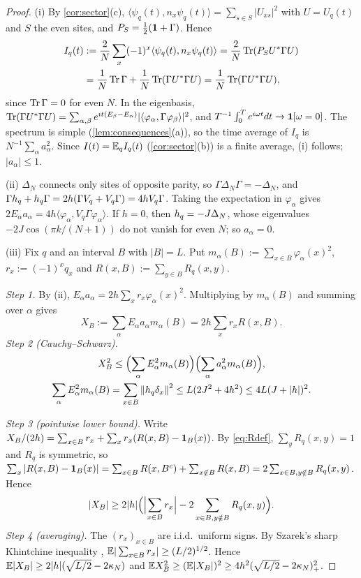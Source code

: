 \begin{proof}
(i) By \cref{cor:sector}(c), $\langle\psi_q(t),n_x\psi_q(t)\rangle=\sum_{s\in S}|U_{xs}|^2$ with $U=U_q(t)$ and
$S$ the even sites, and $P_S=\frac12(\mathbf{1}+\Gamma)$.  Hence
\begin{align*}
  I_q(t)&:=\frac2N\sum_x(-1)^x\langle\psi_q(t),n_x\psi_q(t)\rangle=\frac2N\operatorname{Tr}(P_SU^*\Gamma U)\\
  &=\frac1N\operatorname{Tr}\Gamma+\frac1N\operatorname{Tr}(\Gamma U^*\Gamma U)=\frac1N\operatorname{Tr}(\Gamma U^*\Gamma U),
\end{align*}
since $\operatorname{Tr}\Gamma=0$ for even $N$.  In the eigenbasis,
$\operatorname{Tr}(\Gamma U^*\Gamma U)=\sum_{\alpha,\beta}e^{it(E_\beta-E_\alpha)}|\langle\varphi_\alpha,\Gamma\varphi_\beta\rangle|^2$, and
$T^{-1}\int_0^Te^{i\omega t}dt\to\mathbf{1}[\omega=0]$.  The spectrum is simple (\cref{lem:consequences}(a)), so the
time average of $I_q$ is $N^{-1}\sum_\alpha a_\alpha^2$.  Since $I(t)=\mathbb{E}_qI_q(t)$ (\cref{cor:sector}(b)) is a finite
average, (i) follows; $|a_\alpha|\le1$.

(ii) $\Delta_N$ connects only sites of opposite parity, so $\Gamma\Delta_N\Gamma=-\Delta_N$, and
$\Gamma h_{q}+h_{q}\Gamma=2h(\Gamma V_q+V_q\Gamma)=4hV_q\Gamma$.  Taking the expectation in $\varphi_\alpha$ gives
$2E_\alpha a_\alpha=4h\langle\varphi_\alpha,V_q\Gamma\varphi_\alpha\rangle$.  If $h=0$, then $h_{q}=-J\Delta_N$, whose
eigenvalues $-2J\cos(\pi k/(N+1))$ do not vanish for even $N$; so $a_\alpha=0$.

(iii) Fix $q$ and an interval $B$ with $|B|=L$.  Put $m_\alpha(B):=\sum_{x\in B}\varphi_\alpha(x)^2$,
$r_x:=(-1)^xq_x$ and $R(x,B):=\sum_{y\in B}R_q(x,y)$.

\emph{Step 1.}  By (ii), $E_\alpha a_\alpha=2h\sum_xr_x\varphi_\alpha(x)^2$.  Multiplying by $m_\alpha(B)$ and
summing over $\alpha$ gives
\[
  X_B:=\sum_\alpha E_\alpha a_\alpha m_\alpha(B)=2h\sum_xr_xR(x,B).
\]
\emph{Step 2 (Cauchy--Schwarz).}
\begin{gather*}
  X_B^2\le\Bigl(\sum_\alpha E_\alpha^2m_\alpha(B)\Bigr)\Bigl(\sum_\alpha a_\alpha^2m_\alpha(B)\Bigr),\\
  \sum_\alpha E_\alpha^2m_\alpha(B)=\sum_{x\in B}\left\|h_{q}\delta_x\right\|^2\le L(2J^2+4h^2)\le4L(J+|h|)^2 .
\end{gather*}

\emph{Step 3 (pointwise lower bound).}  Write
$X_B/(2h)=\sum_{x\in B}r_x+\sum_xr_x(R(x,B)-\mathbf{1}_B(x))$.  By \eqref{eq:Rdef}, $\sum_yR_q(x,y)=1$ and $R_q$ is
symmetric, so $\sum_x|R(x,B)-\mathbf{1}_B(x)|=\sum_{x\in B}R(x,B^c)+\sum_{x\notin B}R(x,B)=2\sum_{x\in B,y\notin B}R_q(x,y)$.
Hence
\[
  |X_B|\ge2|h|\Bigl(\Bigl|\sum_{x\in B}r_x\Bigr|-2\sum_{x\in B,y\notin B}R_q(x,y)\Bigr).
\]
\emph{Step 4 (averaging).}  The $(r_x)_{x\in B}$ are i.i.d.\ uniform signs.  By Szarek's sharp Khintchine
inequality \cite{Szarek1976}, $\mathbb{E}|\sum_{x\in B}r_x|\ge(L/2)^{1/2}$.  Hence
$\mathbb{E}|X_B|\ge2|h|(\sqrt{L/2}-2\kappa_N)$ and $\mathbb{E} X_B^2\ge(\mathbb{E}|X_B|)^2\ge4h^2(\sqrt{L/2}-2\kappa_N)_+^2$.


\end{proof}
